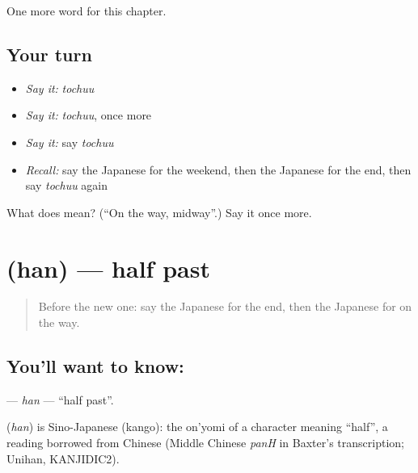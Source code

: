 \begin{grammarlens}[title={What you've built}]
One more word for this chapter.
\end{grammarlens}

\subsection*{Your turn}
\begin{itemize}
\raggedright
  \item \emph{Say it:} \emph{tochuu}
  \item \emph{Say it:} \emph{tochuu}, once more
  \item \emph{Say it:} say \emph{tochuu}
  \item \emph{Recall:} say the Japanese for the weekend, then the Japanese for the end, then say \emph{tochuu} again
\end{itemize}

\begin{tcolorbox}[breakable,colback=teal!4,colframe=teal!35!black,title={Before you move on}]
What does  mean? (\textquotedblleft{}On the way, midway\textquotedblright{}.) Say it once more.
\end{tcolorbox}
\section[\texorpdfstring{\ja{はん} (han)}{はん (han)}]{ (han) — half past}

\label{lesson:JA-C74-han}



\begin{quote}
Before the new one: say the Japanese for the end, then the Japanese for on the way.
\end{quote}

\subsection*{You'll want to know: }
\textbf{} — \emph{han} — \textquotedblleft{}half past\textquotedblright{}.

\begin{cousinweb}
\textbf{} (\emph{han}) is Sino-Japanese (kango): the on'yomi of a character meaning \textquotedblleft{}half\textquotedblright{}, a reading borrowed from Chinese (Middle Chinese \emph{panH} in Baxter's transcription; Unihan, KANJIDIC2).
\end{cousinweb}

